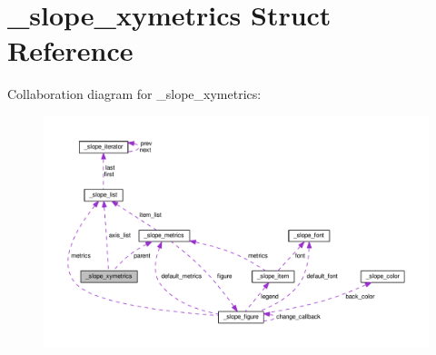 \hypertarget{struct__slope__xymetrics}{\section{\+\_\+slope\+\_\+xymetrics Struct Reference}
\label{struct__slope__xymetrics}
}


Collaboration diagram for \+\_\+slope\+\_\+xymetrics\+:
\nopagebreak
\begin{figure}[H]
\begin{center}
\leavevmode
\includegraphics[width=350pt]{struct__slope__xymetrics__coll__graph}
\end{center}
\end{figure}
